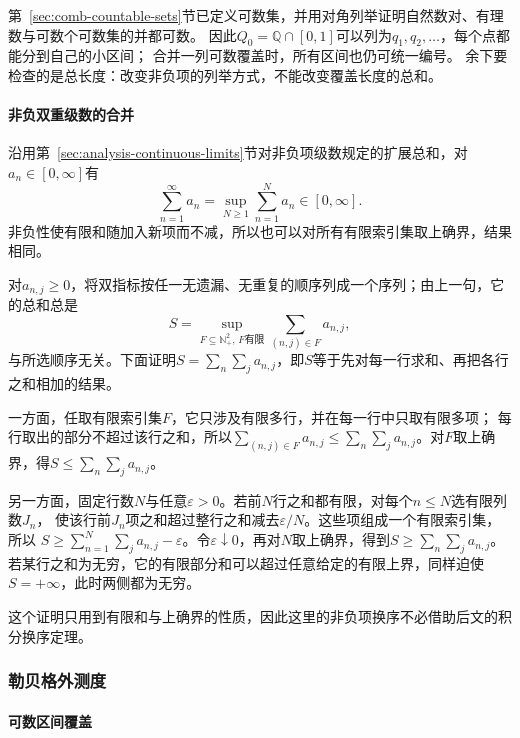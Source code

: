 第~\ref{sec:comb-countable-sets}节已定义可数集，并用对角列举证明自然数对、有理数与可数个可数集的并都可数。
因此$Q_0=\mathbb Q\cap[0,1]$可以列为$q_1,q_2,\ldots$，每个点都能分到自己的小区间；
合并一列可数覆盖时，所有区间也仍可统一编号。
余下要检查的是总长度：改变非负项的列举方式，不能改变覆盖长度的总和。

\paragraph{非负双重级数的合并}

沿用第~\ref{sec:analysis-continuous-limits}节对非负项级数规定的扩展总和，对$a_n\in[0,\infty]$有
\begin{equation}
 \sum_{n=1}^{\infty}a_n
 =\sup_{N\geq1}\sum_{n=1}^Na_n\in[0,\infty].
 \label{eq:comb-nonnegative-sum-supremum}
\end{equation}
非负性使有限和随加入新项而不减，所以也可以对所有有限索引集取上确界，结果相同。

对$a_{n,j}\geq0$，将双指标按任一无遗漏、无重复的顺序列成一个序列；由上一句，它的总和总是
\[
 S=\sup_{F\subseteq\mathbb N_+^2,\,F\text{有限}}
          \sum_{(n,j)\in F}a_{n,j},
\]
与所选顺序无关。下面证明$S=\sum_n\sum_j a_{n,j}$，即$S$等于先对每一行求和、再把各行之和相加的结果。

一方面，任取有限索引集$F$，它只涉及有限多行，并在每一行中只取有限多项；
每行取出的部分不超过该行之和，所以$\sum_{(n,j)\in F}a_{n,j}\leq\sum_n\sum_ja_{n,j}$。对$F$取上确界，得$S\leq\sum_n\sum_ja_{n,j}$。

另一方面，固定行数$N$与任意$\varepsilon>0$。若前$N$行之和都有限，对每个$n\leq N$选有限列数$J_n$，
使该行前$J_n$项之和超过整行之和减去$\varepsilon/N$。这些项组成一个有限索引集，所以
$S\geq\sum_{n=1}^N\sum_ja_{n,j}-\varepsilon$。令$\varepsilon\downarrow0$，再对$N$取上确界，得到$S\geq\sum_n\sum_ja_{n,j}$。
若某行之和为无穷，它的有限部分和可以超过任意给定的有限上界，同样迫使$S=+\infty$，此时两侧都为无穷。

这个证明只用到有限和与上确界的性质，因此这里的非负项换序不必借助后文的积分换序定理。

\subsubsection{勒贝格外测度}
\label{sec:comb-length-and-lebesgue-measure}

\paragraph{可数区间覆盖}

